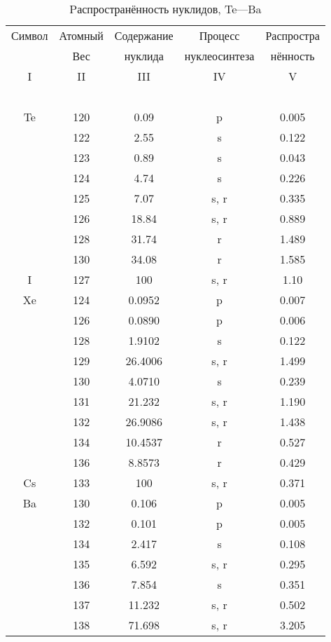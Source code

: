 \documentclass[a5paper,openany]{book}
\begin{document}
\begin{table}[h!]
	{\small
		\begin{tabular}{ccccc}
			Символ  & Атомный &  Содержание  & Процесс & Распростра   \\
			~ & Вес &  нуклида  &  нуклеосинтеза  & нённость  \\
			\hline 
			I & II &  III  & IV & V \\
			\hline 
			~ & ~ & ~ & ~ & ~  \\
			Te & 120 & 0.09 & p & 0.005 \\ [1mm]
			& 122 & 2.55 & s & 0.122 \\ [1mm] 
			& 123 &  0.89 & s & 0.043 \\ [1mm]  			
			& 124 & 4.74 & s & 0.226 \\ [1mm]			
			& 125 & 7.07 & s, r & 0.335 \\ [1mm]			
			& 126 & 18.84 & s, r & 0.889 \\ [1mm]				
			& 128 & 31.74 & r & 1.489 \\ [1mm]			
			& 130 & 34.08 & r & 1.585 \\ [1mm]
			I & 127 & 100 & s, r & 1.10 \\ [1mm]
			Xe & 124 & 0.0952 & p & 0.007 \\ [1mm]
			& 126 & 0.0890 & p & 0.006 \\ [1mm] 
			& 128 &  1.9102 & s & 0.122 \\ [1mm]  			
			& 129 & 26.4006 & s, r & 1.499 \\ [1mm]			
			& 130 & 4.0710 & s & 0.239 \\ [1mm]			
			& 131 & 21.232 & s, r & 1.190 \\ [1mm]				
			& 132 & 26.9086 & s, r & 1.438 \\ [1mm]			
			& 134 & 10.4537 & r & 0.527 \\ [1mm]
			& 136 & 8.8573 & r & 0.429 \\ [1mm]
			Cs & 133 & 100 & s, r & 0.371 \\ [1mm]
			Ba & 130 & 0.106 & p & 0.005 \\ [1mm]
			& 132 & 0.101 & p & 0.005 \\ [1mm] 
			& 134 &  2.417 & s & 0.108 \\ [1mm]  			
			& 135 &  6.592 & s, r & 0.295 \\ [1mm] 			
			& 136 & 7.854 & s & 0.351 \\ [1mm]			
			& 137 & 11.232 & s, r & 0.502\\ [1mm]			
			& 138 & 71.698 & s, r & 3.205 \\ [1mm]				
			\hline 
		\end{tabular}
	}
	\caption{Pаспространённость нуклидов, Te---Ba}
	\label{t:AbudanceSolarTeBa}
\end{table}
\end{document}
